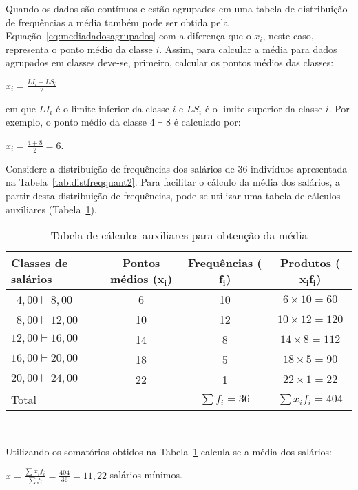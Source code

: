 \documentclass[11pt,fleqn]{book} %
\begin{document}
Quando os dados são contínuos e estão agrupados em uma tabela de distribuição de frequências a média também pode ser obtida pela Equação~\ref{eq:mediadadosagrupados} com a diferença que o $x_i$, neste caso, representa o ponto médio da classe $i$. Assim, para calcular a média para dados agrupados em classes deve-se, primeiro, calcular os pontos médios das classes:

\begin{center}
 $\displaystyle x_i=\frac{LI_i+LS_i}{2}$
\end{center}

\noindent em que $LI_i$ é o limite inferior da classe $i$ e $LS_i$ é o limite superior da classe $i$. Por exemplo, o ponto médio da classe $4 \vdash 8$ é calculado por:

\begin{center}
$\displaystyle x_i = \frac{4+8}{2} = 6$.
\end{center}


\begin{example} \label{exemp:media3}

Considere a distribuição de frequências dos salários de 36 indivíduos apresentada na Tabela~\ref{tab:distfreqquant2}. 
Para facilitar o cálculo da média dos salários, a partir desta distribuição de frequências, pode-se utilizar uma tabela 
de cálculos auxiliares (Tabela~\ref{tab:tabauxmedia}).


	\begin{table}[h]
	\caption{Tabela de cálculos auxiliares para obtenção da média}
	\label{tab:tabauxmedia} 
	\vspace{-0.1cm}
	\centering
	\begin{tabular}{l c c c}
	\toprule
	\textbf{Classes de salários} & \textbf{Pontos médios} ($\bm{x_i}$) & \textbf{Frequências} ($\bm{f_i}$) & \textbf{Produtos} ($\bm{x_i f_i}$) \\
	\midrule
	\,\,\,$4,00 \vdash 8,00$  & 6 &  10  & $6 \times 10 = 60$  \\
	\,\,\,$8,00 \vdash 12,00$  & 10 &  12  &  $10 \times 12 = 120$ \\
	$12,00 \vdash 16,00$  & 14 &  8  &  $14 \times 8 = 112$ \\
	$16,00 \vdash 20,00$  & 18 &  5  &  $18 \times 5 = 90$ \\
	$20,00 \vdash 24,00$  & 22 &  1  &  $22 \times 1 = 22$ \\	
	\hline
	Total  & $-$ &  $\sum{f_i}=36$  &  $\sum{x_i f_i}=404$ \\
	\bottomrule
	\end{tabular} \\
	\end{table}
	
Utilizando os somatórios obtidos na Tabela~\ref{tab:tabauxmedia} calcula-se a média dos salários:

\begin{center}
$\displaystyle \bar{x}=\frac{\sum{x_i f_i}}{\sum{f_i}}=\frac{404}{36}=11,22$ salários mínimos.
\end{center}
	

\end{example}
\end{document}
